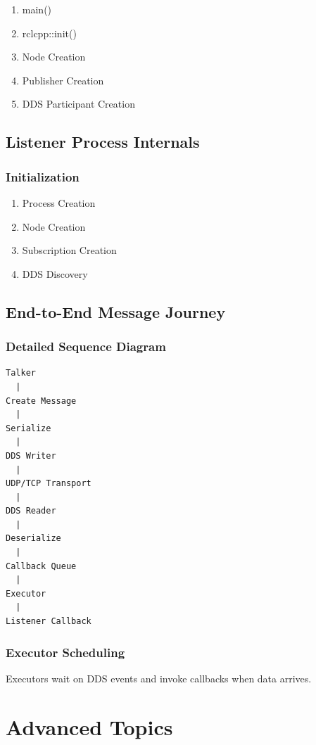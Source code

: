 \documentclass[11pt,oneside]{book}
\begin{document}
\begin{enumerate}
\item main()
\item rclcpp::init()
\item Node Creation
\item Publisher Creation
\item DDS Participant Creation
\end{enumerate}

\chapter{Listener Process Internals}

\section{Initialization}

\begin{enumerate}
\item Process Creation
\item Node Creation
\item Subscription Creation
\item DDS Discovery
\end{enumerate}

\chapter{End-to-End Message Journey}

\section{Detailed Sequence Diagram}

\begin{verbatim}
Talker
  |
Create Message
  |
Serialize
  |
DDS Writer
  |
UDP/TCP Transport
  |
DDS Reader
  |
Deserialize
  |
Callback Queue
  |
Executor
  |
Listener Callback
\end{verbatim}

\section{Executor Scheduling}

Executors wait on DDS events and invoke callbacks when data arrives.

\part{Advanced Topics}
\end{document}
